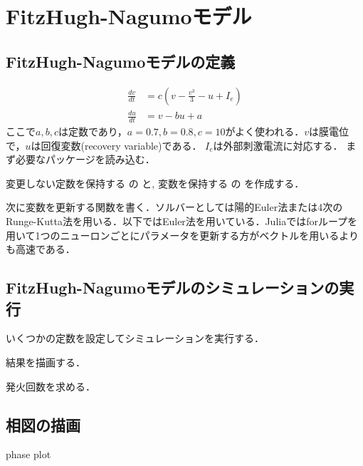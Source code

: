 \section{FitzHugh-Nagumoモデル}
\subsection{FitzHugh-Nagumoモデルの定義}


\begin{align} 
\frac{dv}{dt} &= c\left(v-\frac{v^3}{3}-u+I_e\right)\\ 
\frac{du}{dt} &= v-bu+a 
\end{align}
ここで$a,b,c$は定数であり，$a=0.7, b=0.8, c=10$がよく使われる．$v$は膜電位で，$u$は回復変数(recovery variable)である． $I_e$は外部刺激電流に対応する．
まず必要なパッケージを読み込む．

変更しない定数を保持する  の  と, 変数を保持する  の  を作成する．

次に変数を更新する関数を書く．ソルバーとしては陽的Euler法または4次のRunge-Kutta法を用いる．以下ではEuler法を用いている．Juliaではforループを用いて1つのニューロンごとにパラメータを更新する方がベクトルを用いるよりも高速である．

\subsection{FitzHugh-Nagumoモデルのシミュレーションの実行}
いくつかの定数を設定してシミュレーションを実行する．

結果を描画する．


発火回数を求める．

\subsection{相図の描画}
phase plot



